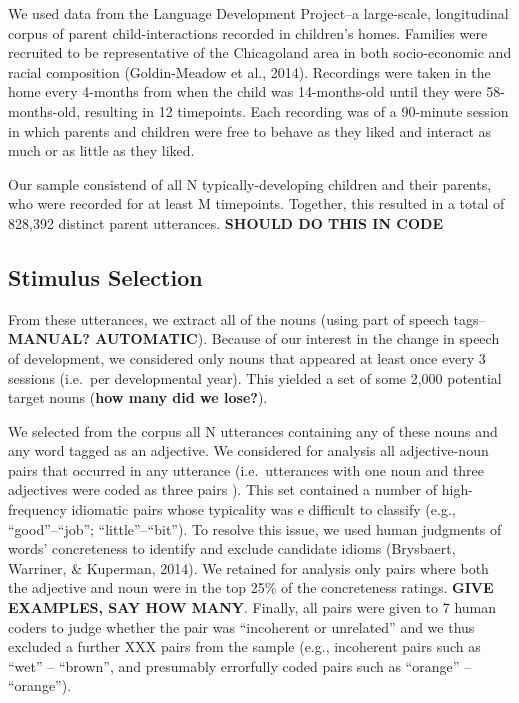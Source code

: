 \documentclass[10pt, letterpaper]{article}
\begin{document}
We used data from the Language Development Project--a large-scale,
longitudinal corpus of parent child-interactions recorded in children's
homes. Families were recruited to be representative of the Chicagoland
area in both socio-economic and racial composition (Goldin-Meadow et
al., 2014). Recordings were taken in the home every 4-months from when
the child was 14-months-old until they were 58-months-old, resulting in
12 timepoints. Each recording was of a 90-minute session in which
parents and children were free to behave as they liked and interact as
much or as little as they liked.

Our sample consistend of all N typically-developing children and their
parents, who were recorded for at least M timepoints. Together, this
resulted in a total of 828,392 distinct parent utterances.
\textbf{SHOULD DO THIS IN CODE}

\hypertarget{stimulus-selection}{%
\subsection{Stimulus Selection}\label{stimulus-selection}}

From these utterances, we extract all of the nouns (using part of speech
tags--\textbf{MANUAL? AUTOMATIC}). Because of our interest in the change
in speech of development, we considered only nouns that appeared at
least once every 3 sessions (i.e.~per developmental year). This yielded
a set of some 2,000 potential target nouns (\textbf{how many did we
lose?}).

We selected from the corpus all N utterances containing any of these
nouns and any word tagged as an adjective. We considered for analysis
all adjective-noun pairs that occurred in any utterance (i.e.~utterances
with one noun and three adjectives were coded as three pairs ). This set
contained a number of high-frequency idiomatic pairs whose typicality
was e difficult to classify (e.g., ``good''--``job'';
``little''--``bit''). To resolve this issue, we used human judgments of
words' concreteness to identify and exclude candidate idioms (Brysbaert,
Warriner, \& Kuperman, 2014). We retained for analysis only pairs where
both the adjective and noun were in the top 25\% of the concreteness
ratings. \textbf{GIVE EXAMPLES, SAY HOW MANY}. Finally, all pairs were
given to 7 human coders to judge whether the pair was ``incoherent or
unrelated'' and we thus excluded a further XXX pairs from the sample
(e.g., incoherent pairs such as ``wet'' -- ``brown'', and presumably
errorfully coded pairs such as ``orange'' -- ``orange'').
\end{document}
